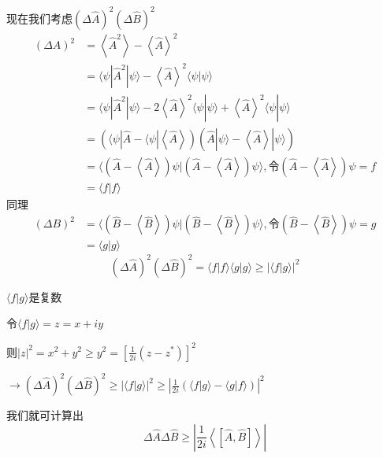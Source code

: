 \documentclass[lang=cn,10pt]{elegantbook}
\begin{document}
现在我们考虑$\left( \varDelta \hat{A} \right) ^2\left( \varDelta \hat{B} \right) ^2$
\begin{equation*}
	\begin{split}
		\left( \varDelta A \right) ^2&=\left< \hat{A}^2 \right> -\left< \hat{A} \right> ^2
		\\
		&=\langle \psi |\hat{A}^2|\psi \rangle -\left< \hat{A} \right> ^2\langle \psi |\psi \rangle 
		\\
		&=\langle \psi |\hat{A}^2|\psi \rangle -2\left< \hat{A} \right> ^2\langle \psi |\psi \rangle +\left< \hat{A} \right> ^2\langle \psi |\psi \rangle 
		\\
			&=\left( \langle \psi |\hat{A}-\langle \psi |\left< \hat{A} \right> \right) \left( \hat{A}|\psi \rangle -\left< \hat{A} \right> |\psi \rangle \right) 
		\\
		&=\langle \left( \hat{A}-\left< \hat{A} \right> \right) \psi |\left( \hat{A}-\left< \hat{A} \right> \right) \psi \rangle ,\text{令}\left( \hat{A}-\left< \hat{A} \right> \right) \psi =f
		\\
		&=\langle f|f\rangle 
	\end{split}
\end{equation*}
同理
\begin{equation*}
	\begin{split}
			\left( \varDelta B \right) ^2&=\langle \left( \hat{B}-\left< \hat{B} \right> \right) \psi |\left( \hat{B}-\left< \hat{B} \right> \right) \psi \rangle ,\text{令}\left( \hat{B}-\left< \hat{B} \right> \right) \psi =g
		\\
		&=\langle g|g\rangle 
	\end{split}
\end{equation*}
\begin{equation*}
	\left( \varDelta \hat{A} \right) ^2\left( \varDelta \hat{B} \right) ^2=\langle f|f\rangle \langle g|g\rangle \ge |\langle f|g\rangle |^2
\end{equation*}

$\langle f|g\rangle$是复数

令$\langle f|g\rangle=z=x+iy$

则$|z|^2=x^2+y^2\ge y^2=[\frac{1}{2i}(z-z^*)]^2 $

	$\rightarrow\left( \varDelta \hat{A} \right) ^2\left( \varDelta \hat{B} \right) ^2\ge |\langle f|g\rangle |^2\ge \left| \frac{1}{2i}\left( \langle f|g\rangle -\langle g|f\rangle \right) \right| ^2$

我们就可计算出
\begin{equation*}
	\varDelta \hat{A}\varDelta \hat{B}\ge |\frac{1}{2i}\left< \left[ \hat{A},\hat{B} \right] \right> |
\end{equation*}
\end{document}
